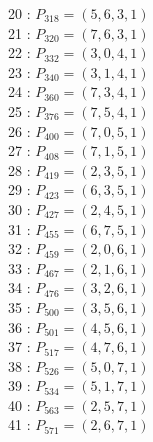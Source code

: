 \documentclass{article}
\begin{document}
{\begin{multicols}{2}
20 : $P_{318}=( 5, 6, 3, 1 )$\\
21 : $P_{320}=( 7, 6, 3, 1 )$\\
22 : $P_{332}=( 3, 0, 4, 1 )$\\
23 : $P_{340}=( 3, 1, 4, 1 )$\\
24 : $P_{360}=( 7, 3, 4, 1 )$\\
25 : $P_{376}=( 7, 5, 4, 1 )$\\
26 : $P_{400}=( 7, 0, 5, 1 )$\\
27 : $P_{408}=( 7, 1, 5, 1 )$\\
28 : $P_{419}=( 2, 3, 5, 1 )$\\
29 : $P_{423}=( 6, 3, 5, 1 )$\\
30 : $P_{427}=( 2, 4, 5, 1 )$\\
31 : $P_{455}=( 6, 7, 5, 1 )$\\
32 : $P_{459}=( 2, 0, 6, 1 )$\\
33 : $P_{467}=( 2, 1, 6, 1 )$\\
34 : $P_{476}=( 3, 2, 6, 1 )$\\
35 : $P_{500}=( 3, 5, 6, 1 )$\\
36 : $P_{501}=( 4, 5, 6, 1 )$\\
37 : $P_{517}=( 4, 7, 6, 1 )$\\
38 : $P_{526}=( 5, 0, 7, 1 )$\\
39 : $P_{534}=( 5, 1, 7, 1 )$\\
40 : $P_{563}=( 2, 5, 7, 1 )$\\
41 : $P_{571}=( 2, 6, 7, 1 )$\\
\end{multicols}
}
\end{document}
